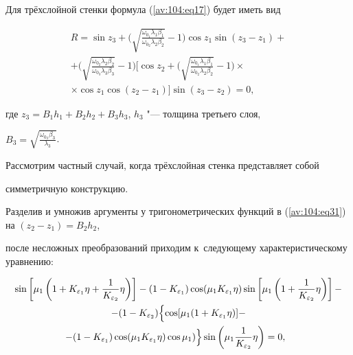 Для трёхслойной стенки формула (\ref{av:104:eq17}) будет иметь вид

\begin{multline}

\label{av:104:eq31}

 R=\sin z_3 +\biggl( \sqrt {\frac{\omega

_{0_1 } \lambda _1 \beta _1 }{\omega _{0_2 } \lambda _2 \beta _2 }} -1

\biggr)\cos z_1 \sin (z_3 -z_1 )+ \\

 +\biggl( \sqrt {\frac{\omega _{0_2 } \lambda _2 \beta _2 }{\omega _{0_3 }

\lambda _3 \beta _3 }} -1 \biggr)\biggl[ \cos z_2 +\biggl(\sqrt

{\frac{\omega _{0_1 } \lambda _1 \beta _1 }{\omega _{0_2 } \lambda _2 \beta

_2 }} -1 \biggr)\times \\

\times \cos z_1 \cos (z_2 -z_1 ) \biggr]\sin (z_3 -z_2)=0,

\end{multline}

где $z_3 =B_1 h_1 +B_2 h_2 +B_3

h_3 $, $h_3 $ "--- толщина третьего слоя,

$B_3 =\sqrt {\frac{\omega _{0_3 } \beta _3 }{\lambda _3 }} $.







Рассмотрим частный случай, когда трёхслойная стенка представляет собой

симметричную конструкцию.

Разделив и умножив аргументы у тригонометрических функций в (\ref{av:104:eq31}) на $(z_2-z_1 )=B_2 h_2 $,

после несложных преобразований приходим к~следующему характеристическому уравнению:

\begin{multline*}

 \sin \left[

\mu _1 \left( 1+K_{\varepsilon _1 } \eta +

\frac{1}{K_{\varepsilon _2 } }\eta  \right) \right]-

(1-K_{\varepsilon _1 } )\cos (\mu _1 K_{\varepsilon _1 } \eta)\sin

\left[ \mu _1 \left( {1+\frac{1}{K_{\varepsilon _2 } }\eta }

\right) \right]- \\

 -(1-K_{\varepsilon _2 } )\Bigl\{ \cos [ \mu_1 (1+K_{\varepsilon _1 } \eta )]- \\

-(1-K_{\varepsilon _1 } )\cos ( \mu _1 K_{\varepsilon _1 } \eta )\cos \mu _1 )\Bigr\} \sin \left(\mu _1\frac{1}{K_{\varepsilon _2 } }\eta  \right)=0, ~~

 \end{multline*}

